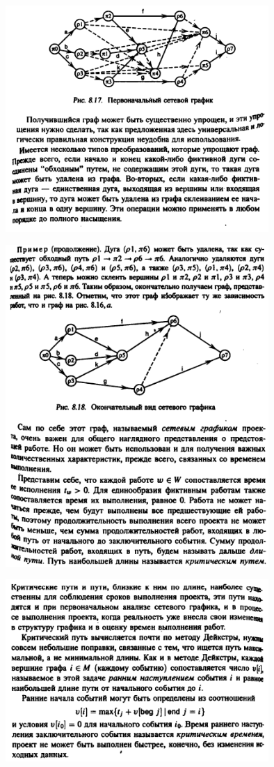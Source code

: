\documentclass[discrete.tex]{subfiles}
\begin{document}
  \begin{figure}[H]
          \includegraphics[width=10cm]{pics/48_4}
          \centering
  \end{figure}

  \begin{figure}[H]
          \includegraphics[width=10cm]{pics/48_5}
          \centering
  \end{figure}

  \begin{figure}[H]
          \includegraphics[width=10cm]{pics/48_6}
          \centering
  \end{figure}
\end{document}
